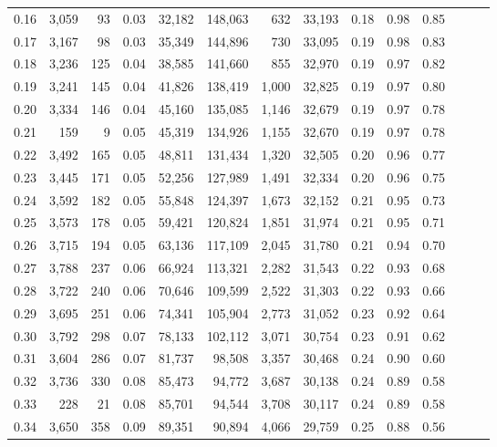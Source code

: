 \begin{tabular}{rrrrrrrrrrrrrr}
0.16 &  3,059 &   93 &  0.03 &   32,182 &  148,063 &     632 &  33,193 &  0.18 &  0.98 &      0.85 \\
0.17 &  3,167 &   98 &  0.03 &   35,349 &  144,896 &     730 &  33,095 &  0.19 &  0.98 &      0.83 \\
0.18 &  3,236 &  125 &  0.04 &   38,585 &  141,660 &     855 &  32,970 &  0.19 &  0.97 &      0.82 \\
0.19 &  3,241 &  145 &  0.04 &   41,826 &  138,419 &   1,000 &  32,825 &  0.19 &  0.97 &      0.80 \\
0.20 &  3,334 &  146 &  0.04 &   45,160 &  135,085 &   1,146 &  32,679 &  0.19 &  0.97 &      0.78 \\
0.21 &    159 &    9 &  0.05 &   45,319 &  134,926 &   1,155 &  32,670 &  0.19 &  0.97 &      0.78 \\
0.22 &  3,492 &  165 &  0.05 &   48,811 &  131,434 &   1,320 &  32,505 &  0.20 &  0.96 &      0.77 \\
0.23 &  3,445 &  171 &  0.05 &   52,256 &  127,989 &   1,491 &  32,334 &  0.20 &  0.96 &      0.75 \\
0.24 &  3,592 &  182 &  0.05 &   55,848 &  124,397 &   1,673 &  32,152 &  0.21 &  0.95 &      0.73 \\
0.25 &  3,573 &  178 &  0.05 &   59,421 &  120,824 &   1,851 &  31,974 &  0.21 &  0.95 &      0.71 \\
0.26 &  3,715 &  194 &  0.05 &   63,136 &  117,109 &   2,045 &  31,780 &  0.21 &  0.94 &      0.70 \\
0.27 &  3,788 &  237 &  0.06 &   66,924 &  113,321 &   2,282 &  31,543 &  0.22 &  0.93 &      0.68 \\
0.28 &  3,722 &  240 &  0.06 &   70,646 &  109,599 &   2,522 &  31,303 &  0.22 &  0.93 &      0.66 \\
0.29 &  3,695 &  251 &  0.06 &   74,341 &  105,904 &   2,773 &  31,052 &  0.23 &  0.92 &      0.64 \\
0.30 &  3,792 &  298 &  0.07 &   78,133 &  102,112 &   3,071 &  30,754 &  0.23 &  0.91 &      0.62 \\
0.31 &  3,604 &  286 &  0.07 &   81,737 &   98,508 &   3,357 &  30,468 &  0.24 &  0.90 &      0.60 \\
0.32 &  3,736 &  330 &  0.08 &   85,473 &   94,772 &   3,687 &  30,138 &  0.24 &  0.89 &      0.58 \\
0.33 &    228 &   21 &  0.08 &   85,701 &   94,544 &   3,708 &  30,117 &  0.24 &  0.89 &      0.58 \\
0.34 &  3,650 &  358 &  0.09 &   89,351 &   90,894 &   4,066 &  29,759 &  0.25 &  0.88 &      0.56 \\

\end{tabular}
